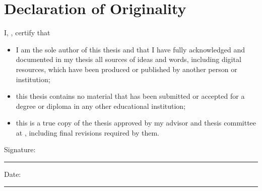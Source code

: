 \chapter*{Declaration of Originality}

\vspace*{20pt}

\noindent I, \authname, certify that 
\begin{itemize} 
	\item I am the sole author of this thesis and that I have fully acknowledged and documented in my thesis all sources of ideas and words, including digital resources, which have been produced or published by another person or institution;
	\item this thesis contains no material that has been submitted or accepted for a degree or diploma in any other educational institution;
	\item this is a true copy of the thesis approved by my advisor and thesis committee at \univname, including final revisions required by them.
\end{itemize}
 
\vspace{40pt}

\noindent Signature:\\
\rule[0.5em]{25em}{0.5pt} %
 
\noindent Date:\\
\rule[0.5em]{25em}{0.5pt} %

